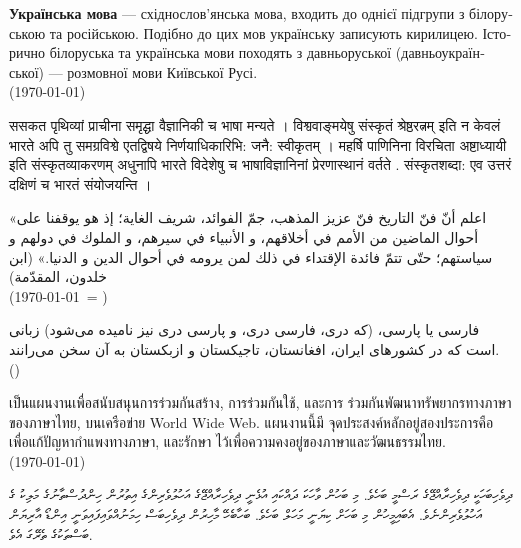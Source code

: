 \documentclass[a4paper]{article}
\begin{document}
\begin{ukrainian}
\textbf{Українська мова} — східнослов'янська мова, входить до однієї підгрупи з білоруською та російською. Подібно до цих мов українську записують кирилицею. Історично білоруська та українська мови походять з давньоруської (давньоукраїнської) — розмовної мови Київської Русі.\\
(\today)
\end{ukrainian}

\begin{sanskrit}
{\Large ससकत} पृथिव्यां प्राचीना समृद्घा वैज्ञानिकी च भाषा मन्यते । विश्ववाङ्‌मयेषु संस्कृतं श्रेष्ठरत्नम् इति न केवलं भारते अपि तु समग्रविश्वे एतद्विषये निर्णयाधिकारिभि: जनै: स्वीकृतम् । महर्षि पाणिनिना विरचिता अष्टाध्यायी इति संस्कृतव्याकरणम्‌ अधुनापि भारते विदेशेषु च भाषाविज्ञानिनां प्रेरणास्‍थानं वर्तते . संस्कृतशब्दा: एव उत्तरं दक्षिणं च भारतं संयोजयन्ति ।
\end{sanskrit}

\begin{Arabic}[]
«اعلم أنّ فنّ التاريخ فنّ عزيز المذهب، جمّ الفوائد، شريف الغاية؛ إذ هو يوقفنا على أحوال الماضين من الأمم في أخلاقهم، و الأنبياء في سيرهم، و الملوك في دولهم و سياستهم؛ حتّى تتمّ فائدة الإقتداء في ذلك لمن يرومه في أحوال الدين و الدنيا.» (ابن خلدون، المقدّمة)\\
(\today\ = \Hijritoday[0])
\end{Arabic}

\begin{farsi}
فارسی یا پارسی، (که دری، فارسی دری، و پارسی دری نیز نامیده می‌شود) زبانی است که
در کشورهای ایران، افغانستان، تاجیکستان و ازبکستان به آن سخن می‌رانند. \\
(\Jalalitoday)
\end{farsi}

\begin{thai}
เป็น\wbr แผนงานเพื่อ\wbr สนับสนุน\wbr การ\wbr ร่วมกัน\wbr สร้าง, การ\wbr ร่วมกันใช้, และ\wbr การ%
ร่วมกัน\wbr พัฒนา\wbr ทรัพยากร\wbr ทาง\wbr ภาษา\wbr ของ\wbr ภาษา\wbr ไทย, บน\wbr เครือข่าย World Wide Web. แผนงานนี้\wbr มี%
จุด\wbr ประสงค์หลั\wbr กอยู่\wbr สอง\wbr ประการคือ เพื่อแก้ปัญหา\wbr กำ\wbr แพง\wbr ทาง\wbr ภาษา, และรักษา%
ไว้เพื่อ\wbr ความค\wbr งอยู่\wbr ของ\wbr ภาษา\wbr และ\wbr วัฒนธรรม\wbr ไทย. \\
(\today)
\end{thai}

\begin{divehi}\small\sloppy
ދިވެހިބަހަކީ ދިވެހިރާއްޖޭގެ ރަސްމީ ބަހެވެ. މި ބަހުން ވާހަކަ ދައްކައި އުޅެނީ ދިވެހިރާއްޖޭގެ އަހުލުވެރިންގެ އިތުރުން ހިންދުސްތާނުގެ މަލިކު ގެ
އަހުލުވެރިންނެވެ. އެބައިމީހުން މި ބަހަށް ކިޔަނީ މަހަލް ބަހެވެ. ބަހާބެހޭ މާހިރުން ދިވެހިބަސް ހިމަނުއްވައިފައިވަނީ އިންޑޯ އާރިޔަން ބަސްތަކުގެ
ތެރޭގަ އެވެ. 
\end{divehi}
\end{document}
